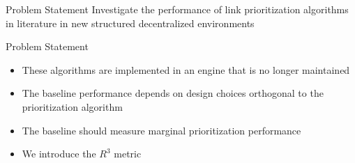 
\begin{frame}{Problem Statement}
    \centering
    Investigate the performance of link prioritization algorithms in literature in new structured decentralized environments
\end{frame}

\begin{frame}{Problem Statement}
    \begin{itemize}
        \item These algorithms are implemented in an engine that is no longer maintained
        \item The baseline performance depends on design choices orthogonal to the prioritization algorithm
        \item The baseline should measure marginal prioritization performance
        \item We introduce the $R^{3}$ metric
    \end{itemize}
\end{frame}
